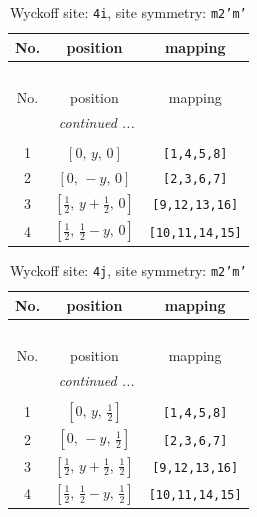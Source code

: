 \documentclass[fleqn,8pt]{jsarticle}
\begin{document}
\renewcommand{\arraystretch}{1.2}
\begin{longtable}{ccc}
\caption{Wyckoff site: {\tt 4i}, site symmetry: {\tt m2'm'}}
 \\
 \hline \hline
No. & position & mapping \\ \hline \endfirsthead

\multicolumn{2}{l}{\tablename\ \thetable{}} \\
 \hline \hline
No. & position & mapping \\ \hline \endhead

 \hline \hline
\multicolumn{2}{r}{\footnotesize\it continued ...} \\ \endfoot

 \hline \hline
\multicolumn{2}{r}{} \\ \endlastfoot

1 & $\left[ 0,\, y,\, 0 \right]$ & {\tt [1,4,5,8]} \\ \hline
2 & $\left[ 0,\, - y,\, 0 \right]$ & {\tt [2,3,6,7]} \\ \hline
3 & $\left[ \frac{1}{2},\, y + \frac{1}{2},\, 0 \right]$ & {\tt [9,12,13,16]} \\ \hline
4 & $\left[ \frac{1}{2},\, \frac{1}{2} - y,\, 0 \right]$ & {\tt [10,11,14,15]} \\
\end{longtable}
\renewcommand{\arraystretch}{1.2}
\begin{longtable}{ccc}
\caption{Wyckoff site: {\tt 4j}, site symmetry: {\tt m2'm'}}
 \\
 \hline \hline
No. & position & mapping \\ \hline \endfirsthead

\multicolumn{2}{l}{\tablename\ \thetable{}} \\
 \hline \hline
No. & position & mapping \\ \hline \endhead

 \hline \hline
\multicolumn{2}{r}{\footnotesize\it continued ...} \\ \endfoot

 \hline \hline
\multicolumn{2}{r}{} \\ \endlastfoot

1 & $\left[ 0,\, y,\, \frac{1}{2} \right]$ & {\tt [1,4,5,8]} \\ \hline
2 & $\left[ 0,\, - y,\, \frac{1}{2} \right]$ & {\tt [2,3,6,7]} \\ \hline
3 & $\left[ \frac{1}{2},\, y + \frac{1}{2},\, \frac{1}{2} \right]$ & {\tt [9,12,13,16]} \\ \hline
4 & $\left[ \frac{1}{2},\, \frac{1}{2} - y,\, \frac{1}{2} \right]$ & {\tt [10,11,14,15]} \\
\end{longtable}
\end{document}
